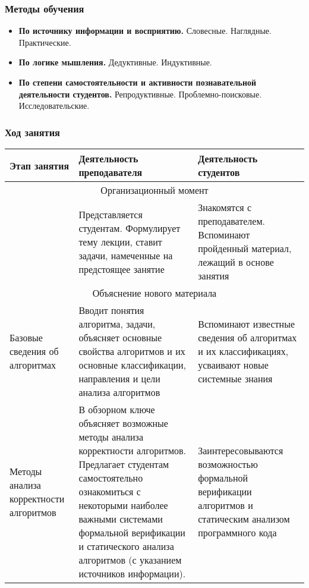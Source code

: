 \documentclass[compress, 9pt]{beamer}
\begin{document}
\begin{refsection}
\begin{frame}
    \end{frame}

    \begin{frame}\frametitle{Методы обучения}

        \begin{itemize}\justifying
            \item \textbf{По источнику информации и восприятию.} Словесные. Наглядные. Практические.
            \item \textbf{По логике мышления.} Дедуктивные. Индуктивные.
            \item \textbf{По степени самостоятельности и активности познавательной деятельности студентов.} Репродуктивные. Проблемно-поисковые. Исследовательские.
        \end{itemize}

    \end{frame}

    \begin{frame}\frametitle{Ход занятия}\footnotesize

        \begin{tabular}{| p{} | p{} | p{} |}\hline
            {\textbf{Этап занятия}} &
            {\textbf{Деятельность преподавателя}} &
            {\textbf{Деятельность студентов}} \\ \hline

            \multicolumn{3}{|c|}{Организационный момент} \\ \hline

            {} &
            {Представляется студентам. Формулирует тему лекции, ставит задачи, намеченные на предстоящее занятие} &
            {Знакомятся с преподавателем. Вспоминают пройденный материал, лежащий в основе занятия} \\ \hline

            \multicolumn{3}{|c|}{Объяснение нового материала} \\ \hline

            {Базовые сведения об алгоритмах} &
            {Вводит понятия алгоритма, задачи, объясняет основные свойства алгоритмов и их основные классификации, направления и цели анализа алгоритмов} &
            {Вспоминают известные сведения об алгоритмах и их классификациях, усваивают новые системные знания} \\ \hline

            {Методы анализа корректности алгоритмов} &
            {В обзорном ключе объясняет возможные методы анализа корректности алгоритмов. Предлагает студентам самостоятельно ознакомиться с некоторыми наиболее важными системами формальной верификации и статического анализа алгоритмов (с указанием источников информации).} &
            {Заинтересовываются возможностью формальной верификации алгоритмов и статическим анализом программного кода} \\ \hline
        \end{tabular}


\end{frame}
\end{refsection}
\end{document}
